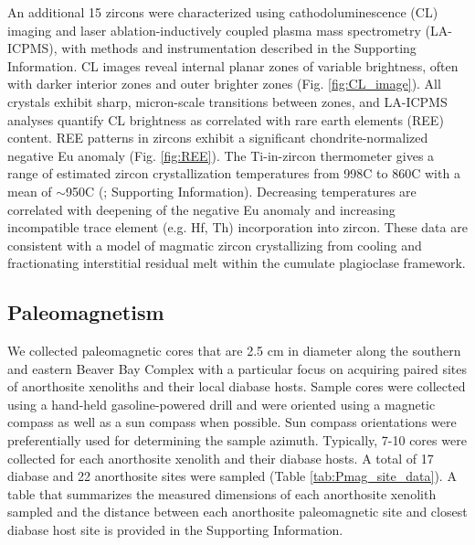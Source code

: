 \documentclass[draft]{agujournal2019}
\begin{document}
An additional 15 zircons were characterized using cathodoluminescence (CL) imaging and laser ablation-inductively coupled plasma mass spectrometry (LA-ICPMS), with methods and instrumentation described in the Supporting Information. CL images reveal internal planar zones of variable brightness, often with darker interior zones and outer brighter zones (Fig. \ref{fig:CL_image}). All crystals exhibit sharp, micron-scale transitions between zones, and LA-ICPMS analyses quantify CL brightness as correlated with rare earth elements (REE) content. REE patterns in zircons exhibit a significant chondrite-normalized negative Eu anomaly (Fig. \ref{fig:REE}). The Ti-in-zircon thermometer gives a range of estimated zircon crystallization temperatures from 998\textdegree C to 860\textdegree C with a mean of $\sim$950\textdegree C (; Supporting Information). Decreasing temperatures are correlated with deepening of the negative Eu anomaly and increasing incompatible trace element (e.g. Hf, Th) incorporation into zircon. These data are consistent with a model of magmatic zircon crystallizing from cooling and fractionating interstitial residual melt within the cumulate plagioclase framework.

\subsection{Paleomagnetism}

We collected paleomagnetic cores that are 2.5 cm in diameter along the southern and eastern Beaver Bay Complex with a particular focus on acquiring paired sites of anorthosite xenoliths and their local diabase hosts. Sample cores were collected using a hand-held gasoline-powered drill and were oriented using a magnetic compass as well as a sun compass when possible. Sun compass orientations were preferentially used for determining the sample azimuth. Typically, 7-10 cores were collected for each anorthosite xenolith and their diabase hosts. A total of 17 diabase and 22 anorthosite sites were sampled (Table \ref{tab:Pmag_site_data}). A table that summarizes the measured dimensions of each anorthosite xenolith sampled and the distance between each anorthosite paleomagnetic site and closest diabase host site is provided in the Supporting Information.  
\end{document}
